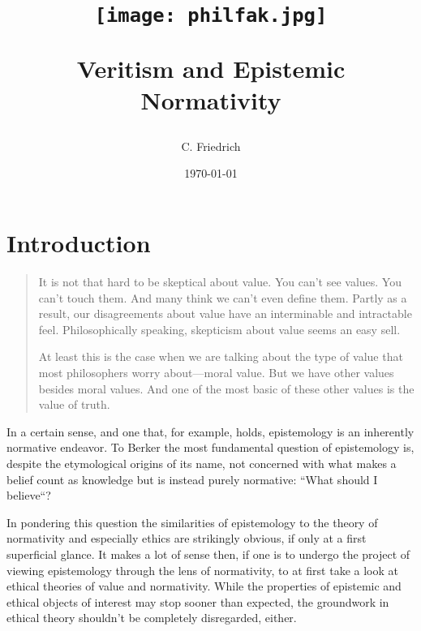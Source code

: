 \documentclass[12pt,numbers=noenddot]{scrartcl}
\title {    \begin{center}
        \texttt{[image: philfak.jpg]}
    \end{center}
     Veritism and Epistemic Normativity }
\author{C. Friedrich}
\date{\today}
\begin{document}
\begin{titlepage}
\maketitle


\thispagestyle{empty}
\end{titlepage}

\tableofcontents
\newpage

\section{Introduction}

\begin{quote}
    It is not that hard to be skeptical about value. You can't see values. You can't touch them. And many think we can't even define them. Partly as a result, our disagreements about value have an interminable and intractable feel. Philosophically speaking, skepticism about value seems an easy sell.

    At least this is the case when we are talking about the type of value that most philosophers worry about—moral value. But we have other values besides moral values. And one of the most basic of these other values is the value of truth. \autocite[225]{Lynch2009}
\end{quote}


In a certain sense, and one that, for example, \textcite{Berker2013-BERETA-2} holds, epistemology is an inherently normative endeavor. To Berker the most fundamental question of epistemology is, despite the etymological origins of its name, not concerned with what makes a belief count as knowledge but is instead purely normative: “What should I believe“?

In pondering this question the similarities of epistemology to the theory of normativity and especially ethics are strikingly obvious, if only at a first superficial glance. It makes a lot of sense then, if one is to undergo the project of viewing epistemology through the lens of normativity, to at first take a look at ethical theories of value and normativity. While the properties of epistemic and ethical objects of interest may stop sooner than expected, the groundwork in ethical theory shouldn't be completely disregarded, either.
\end{document}
